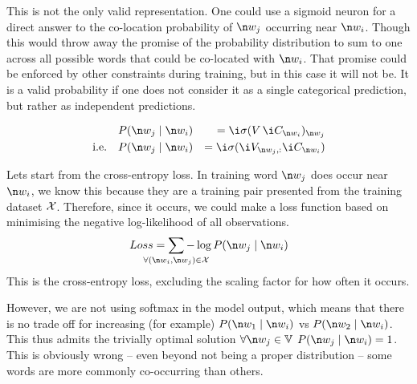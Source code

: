 {This is not the only valid representation.
One could use a sigmoid neuron for a direct answer to the co-location probability of $\n w_j$ occurring near $\n w_i$.
Though this would throw away the promise of the probability distribution to sum to one across all possible words that could be co-located with $\n w_i$.
That promise could be enforced by other constraints during training, but in this case it will not be.
It is a valid probability if one does not consider it as a single categorical prediction, but rather as independent predictions.

\begin{align}
&P(\n w_j \mid \n w_i) & = \i \sigma(V\,\i C_{\n w_i})_{\n w_j} \\
\text{i.e.}\quad&P(\n w_j \mid \n w_i) & = \i \sigma(\i V_{\n w_j,:} \i C_{\n w_i})
\end{align}


Lets start from the cross-entropy loss.%
%
In training word $\n w_j$ does occur near $\n w_i$, we know this because they are a training pair presented from the training dataset $\mathcal{X}$.
Therefore, since it occurs, we could make a loss function based on minimising the negative log-likelihood of all observations.
\begin{equation}
Loss = \sum_{\mathclap{\forall (\n w_i,\n w_j)\in \seq{X}}} -\log P(\n w_j\mid \n w_i)
\end{equation}
This is the cross-entropy loss, excluding the scaling factor for how often it occurs.

However, we are not using softmax in the model output,
which means that there is no trade off for increasing (for example) $P(\n w_1\mid \n w_i)$ vs $P(\n w_2\mid \n w_i)$.
This thus admits the trivially optimal solution $\forall \n w_j\in \set{V}$ $P(\n w_j \mid \n w_i) = 1$.
This is obviously wrong -- even beyond not being a proper distribution -- some words are more commonly co-occurring than others.

}
